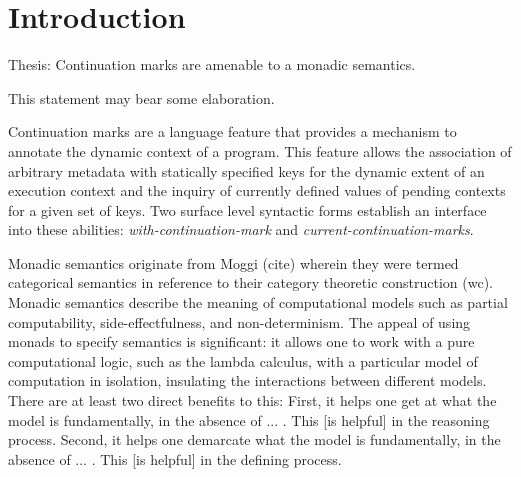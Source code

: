 \documentclass[ms]{byuprop}
\title{\Title}
\author{\Author}
\begin{document}
\maketitle



\section{Introduction}


Thesis: Continuation marks are amenable to a monadic semantics.

This statement may bear some elaboration. 

Continuation marks are a language feature that provides a mechanism to annotate the dynamic context of a program. This feature allows the association of arbitrary metadata with statically specified keys for the dynamic extent of an execution context and the inquiry of currently defined values of pending contexts for a given set of keys. Two surface level syntactic forms establish an interface into these abilities: \emph{with-continuation-mark} and \emph{current-continuation-marks}.

Monadic semantics originate from Moggi (cite) wherein they were termed categorical semantics in reference to their category theoretic construction (wc). Monadic semantics describe the meaning of computational models such as partial computability, side-effectfulness, and non-determinism. The appeal of using monads to specify semantics is significant: it allows one to work with a pure computational logic, such as the lambda calculus, with a particular model of computation in isolation, insulating the interactions between different models. There are at least two direct benefits to this: First, it helps one get at what the model is fundamentally, in the absence of ... . This [is helpful] in the reasoning process. Second, it helps one demarcate what the model is fundamentally, in the absence of ... . This [is helpful] in the defining process.

\end{document}
